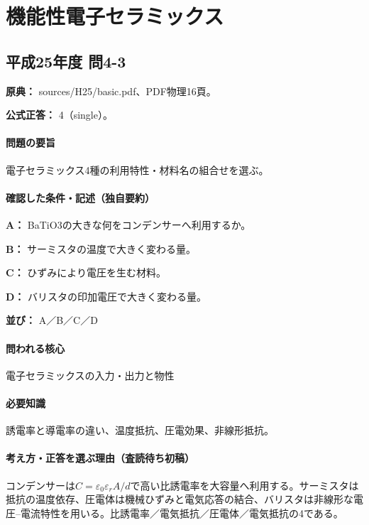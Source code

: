 \section{機能性電子セラミックス}

\subsection{平成25年度 問4-3}
\label{q:h25-reg-basic-4-3}

\noindent\textbf{原典：} sources/H25/basic.pdf、PDF物理16頁。

\textbf{公式正答：} 4（single）。

\paragraph{問題の要旨} 電子セラミックス4種の利用特性・材料名の組合せを選ぶ。

\paragraph{確認した条件・記述（独自要約）}\mbox{}\par

\noindent\textbf{A：} BaTiO3の大きな何をコンデンサーへ利用するか。\par

\noindent\textbf{B：} サーミスタの温度で大きく変わる量。\par

\noindent\textbf{C：} ひずみにより電圧を生む材料。\par

\noindent\textbf{D：} バリスタの印加電圧で大きく変わる量。\par

\noindent\textbf{並び：} A／B／C／D\par

\paragraph{問われる核心} 電子セラミックスの入力・出力と物性

\paragraph{必要知識} 誘電率と導電率の違い、温度抵抗、圧電効果、非線形抵抗。

\paragraph{考え方・正答を選ぶ理由（査読待ち初稿）} コンデンサーは\(C=\varepsilon_0\varepsilon_r A/d\)で高い比誘電率を大容量へ利用する。サーミスタは抵抗の温度依存、圧電体は機械ひずみと電気応答の結合、バリスタは非線形な電圧–電流特性を用いる。比誘電率／電気抵抗／圧電体／電気抵抗の4である。

